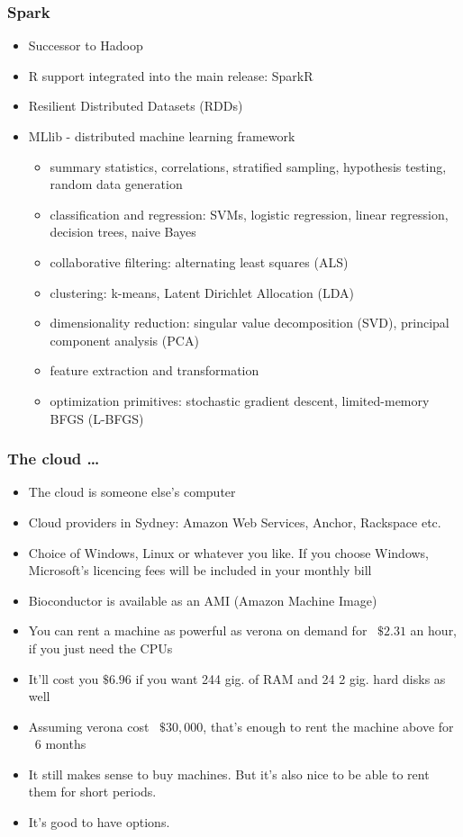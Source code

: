 \documentclass{beamer}
\begin{document}
\begin{frame}
\frametitle{Spark}
\begin{itemize}
\item Successor to Hadoop
\item R support integrated into the main release: SparkR
\item Resilient Distributed Datasets (RDDs)
\item MLlib - distributed machine learning framework
	\begin{itemize}
  \item summary statistics, correlations, stratified sampling, hypothesis testing, random data generation
  \item classification and regression: SVMs, logistic regression, linear regression, decision trees, naive Bayes
  \item collaborative filtering: alternating least squares (ALS)
  \item clustering: k-means, Latent Dirichlet Allocation (LDA)
  \item dimensionality reduction: singular value decomposition (SVD), principal component analysis (PCA)
  \item feature extraction and transformation
  \item optimization primitives: stochastic gradient descent, limited-memory BFGS (L-BFGS)
  \end{itemize}
\end{itemize}
\end{frame}

\begin{frame}
\frametitle{The cloud \ldots}
\begin{itemize}
\item The cloud is someone else's computer
\item Cloud providers in Sydney: Amazon Web Services, Anchor, Rackspace etc.
\item Choice of Windows, Linux or whatever you like. If you choose Windows, Microsoft's 
			licencing fees will be included in your monthly bill
\item Bioconductor is available as an AMI (Amazon Machine Image)
\item You can rent a machine as powerful as verona on demand for ~$\$2.31$ an hour, if you 
			just need the CPUs
\item It'll cost you $\$6.96$ if you want 244 gig. of RAM and 24 2 gig. hard disks as well
\item Assuming verona cost ~$\$30,000$, that's enough to rent the machine above for ~6 months
\item It still makes sense to buy machines. But it's also nice to be able to rent them for
			short periods.
\item It's good to have options.
\end{itemize}
\end{frame}
\end{document}
